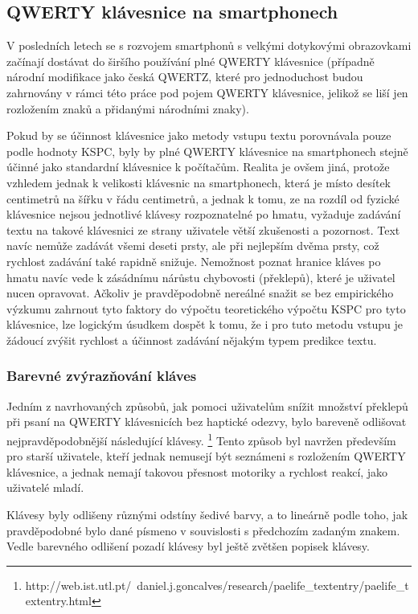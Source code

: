 \documentclass{article}
\begin{document}
\subsection{QWERTY klávesnice na smartphonech}

V posledních letech se s rozvojem smartphonů s velkými dotykovými obrazovkami začínají dostávat do širšího používání plné QWERTY klávesnice (případně národní modifikace jako česká QWERTZ, které pro jednoduchost budou zahrnovány v rámci této práce pod pojem QWERTY klávesnice, jelikož se liší jen rozložením znaků a přidanými národními znaky). 

Pokud by se účinnost klávesnice jako metody vstupu textu porovnávala pouze podle hodnoty KSPC, byly by plné QWERTY klávesnice na smartphonech stejně účinné jako standardní klávesnice k počítačům. Realita je ovšem jiná, protože vzhledem jednak k velikosti klávesnic na smartphonech, která je místo desítek centimetrů na šířku v řádu centimetrů, a jednak k tomu, ze na rozdíl od fyzické klávesnice nejsou jednotlivé klávesy rozpoznatelné po hmatu, vyžaduje zadávání textu na takové klávesnici ze strany uživatele větší zkušenosti a pozornost. Text navíc nemůže zadávát všemi deseti prsty, ale při nejlepším dvěma prsty, což rychlost zadávání také rapidně snižuje. Nemožnost poznat hranice kláves po hmatu navíc vede k zásádnímu nárůstu chybovosti (překlepů), které je uživatel nucen opravovat. Ačkoliv je pravděpodobně nereálné snažit se bez empirického výzkumu zahrnout tyto faktory do výpočtu teoretického výpočtu KSPC pro tyto klávesnice, lze logickým úsudkem dospět k tomu, že i pro tuto metodu vstupu je žádoucí zvýšit rychlost a účinnost zadávání nějakým typem predikce textu.

\subsubsection{Barevné zvýrazňování kláves}

Jedním z navrhovaných způsobů, jak pomoci uživatelům snížit množství překlepů při psaní na QWERTY klávesnicích bez haptické odezvy, bylo bareveně odlišovat nejpravděpodobnější následující klávesy. \footnote{http://web.ist.utl.pt/~daniel.j.goncalves/research/paelife\_textentry/paelife\_textentry.html} Tento způsob byl navržen především pro starší uživatele, kteří jednak nemusejí být seznámeni s rozložením QWERTY klávesnice, a jednak nemají takovou přesnost motoriky a rychlost reakcí, jako uživatelé mladí. 

Klávesy byly odlišeny různými odstíny šedivé barvy, a to lineárně podle toho, jak pravděpodobné bylo dané písmeno v souvislosti s předchozím zadaným znakem. Vedle barevného odlišení pozadí klávesy byl ještě zvětšen popisek klávesy.
\end{document}
